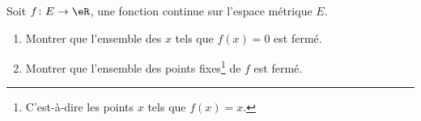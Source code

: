 
\begin{exercice}\label{exo0085}

Soit $f\colon E\to \eR$, une fonction continue sur l'espace métrique $E$.
\begin{enumerate}

\item
Montrer que l'ensemble des $x$ tels que $f(x)=0$ est fermé.

\item
Montrer que l'ensemble des points fixes\footnote{C'est-à-dire les points $x$ tels que $f(x)=x$.} de $f$ est fermé.

\end{enumerate}

\end{exercice}
